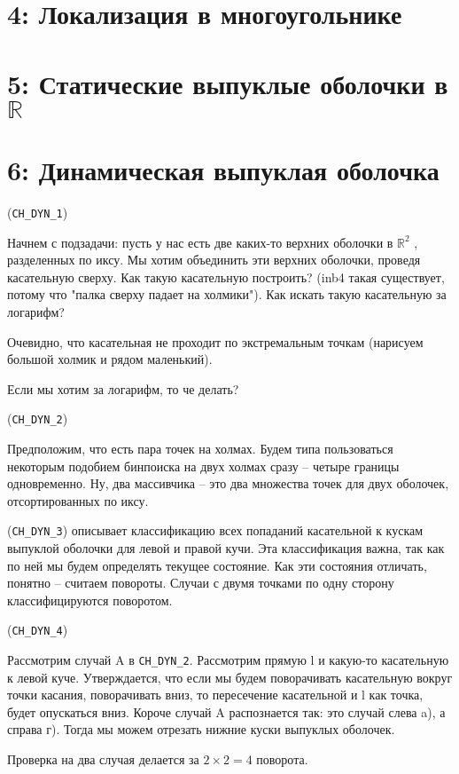 \documentclass[11pt]{article}
\begin{document}
\section{{\bfseries{}} 4:  Локализация в многоугольнике}
\label{sec-5}
\section{{\bfseries{}} 5:  Статические выпуклые оболочки в $\mathbb{R}$}
\label{sec-6}
\section{{\bfseries{}} 6:  Динамическая выпуклая оболочка}
\label{sec-7}
(\verb~CH_DYN_1~)

Начнем с подзадачи: пусть у нас есть две каких-то верхних оболочки в
$\mathbb{R}^2$ , разделенных по иксу. Мы хотим объединить эти верхних оболочки,
проведя касательную сверху. Как такую касательную построить? (inb4
такая существует, потому что "палка сверху падает на холмики"). Как
искать такую касательную за логарифм?

Очевидно, что касательная не проходит по экстремальным точкам
(нарисуем большой холмик и рядом маленький).

Если мы хотим за логарифм, то че делать?

(\verb~CH_DYN_2~)

Предположим, что есть пара точек на холмах. Будем типа пользоваться
некоторым подобием бинпоиска на двух холмах сразу -- четыре границы
одновременно. Ну, два массивчика -- это два множества точек для двух
оболочек, отсортированных по иксу.

(\verb~CH_DYN_3~) описывает классификацию всех попаданий касательной к кускам
выпуклой оболочки для левой и правой кучи. Эта классификация важна,
так как по ней мы будем определять текущее состояние. Как эти
состояния отличать, понятно -- считаем повороты. Случаи с двумя
точками по одну сторону классифицируются поворотом.

(\verb~CH_DYN_4~)

Рассмотрим случай A в \verb~CH_DYN_2~. Рассмотрим прямую l и какую-то
касательную к левой куче. Утверждается, что если мы будем
поворачивать касательную вокруг точки касания, поворачивать вниз, то
пересечение касательной и l как точка, будет опускаться вниз.
Короче случай A распознается так: это случай слева a), а справа
г). Тогда мы можем отрезать нижние куски выпуклых оболочек.

Проверка на два случая делается за $2\times2 = 4$ поворота.
\end{document}
